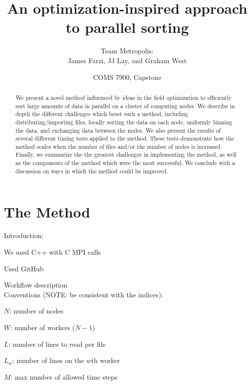 \documentclass{article}
\begin{document}
\title{An optimization-inspired approach to parallel sorting}
\author{Team Metropolis: \\
		James Farzi, JJ Lay, and Graham West}
\date{COMS 7900, Capstone}

\maketitle

\begin{abstract}
We present a novel method influenced by ideas in the field optimization to efficiently sort large amounts of data in parallel on a cluster of computing nodes. We describe in depth the different challenges which beset such a method, including distributing/importing files, locally sorting the data on each node, uniformly binning the data, and exchanging data between the nodes. We also present the results of several different timing tests applied to the method. These tests demonstrate how the method scales when the number of files and/or the number of nodes is increased. Finally, we summarize the the greatest challenges in implementing the method, as well as the components of the method which were the most successful. We conclude with a discussion on ways in which the method could be improved.
\end{abstract}


\tableofcontents


\section{The Method}

Introduction:

We used C++ with C MPI calls

Used GitHub

Workflow description\\



Conventions (NOTE: be consistent with the indices):

$N$: number of nodes

$W$: number of workers ($N-1$)

$L$: number of lines to read per file

$L_w$: number of lines on the $w$th worker

$M$: max number of allowed time steps
\end{document}
